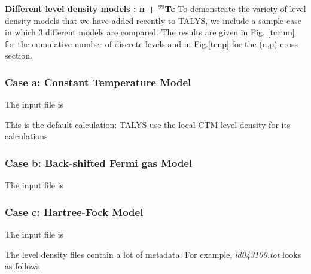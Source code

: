 \begin{samplecase}
{\bf Different level density models : n + ${}^{99}$Tc}\newline
To demonstrate the variety of level density models that we have added 
recently to TALYS, we include a sample case in which 3 different models 
are compared. The results are given in Fig. \ref{tccum} for
the cumulative number of discrete levels and in Fig.\ref{tcnp} for the (n,p)
cross section.
\subsubsection{Case a: Constant Temperature Model}
The input file is


This is the default calculation: TALYS use the local CTM level density for
its calculations
\subsubsection{Case b: Back-shifted Fermi gas Model}
The input file is


\subsubsection{Case c: Hartree-Fock Model}
The input file is


The level density files contain a lot of metadata. For example, {\em ld043100.tot} looks as follows
{\small \begin{verbatim}


\end{verbatim}}
\end{samplecase}
